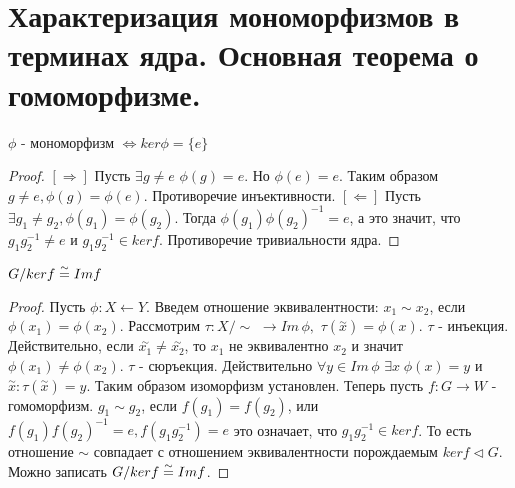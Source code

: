 \section{Характеризация мономорфизмов в терминах ядра. Основная теорема о гомоморфизме.}

\begin{thm}
$ \phi $ - мономорфизм $ \Leftrightarrow ker \phi = \{e\} $
\end{thm}
\begin{proof}
  $ [\Rightarrow] $ Пусть $ \exists g \ne e $ $ \phi(g) = e $. Но $ \phi(e) = e $. Таким образом $ g \ne e, \phi(g) = \phi(e) $. 
  Противоречие инъективности. \newline
  $ [\Leftarrow] $ Пусть $ \exists g_{1} \ne g_{2}, \phi(g_{1}) = \phi(g_{2}) $. Тогда $ \phi(g_{1})\phi(g_{2})^{-1} = e $,
  а это значит, что $ g_{1}g_{2}^{-1} \ne e $ и $ g_{1}g_{2}^{-1} \in ker f $. Противоречие тривиальности ядра. 
\end{proof}

\begin{thm}
  $ G/ker f \buildrel{\sim}\over{=} Im f $
\end{thm}
\begin{proof}
  Пусть $ \phi : X \leftarrow Y $. Введем отношение эквивалентности: $ x_1 \sim x_2 $, если $ \phi(x_1) = \phi(x_2) $. 
  Рассмотрим $ \tau : X/\!\!\!\sim  $ $ \rightarrow Im \, \phi, $ $ \tau(\overset\sim{x}) = \phi(x). $ \newline
  $ \tau $ - инъекция. Действительно, если $ \overset\sim{x_1} \ne \overset\sim{x_2} $, то $ x_1 $ не эквивалентно $ x_2 $
  и значит $ \phi(x_1) \ne \phi(x_2) $. \newline
  $ \tau $ - сюръекция. Действительно $ \forall y \in Im \, \phi $ $ \exists x \; \phi(x) = y $ и 
  $ \overset\sim{x} : \tau(\overset\sim{x}) = y $. Таким образом изоморфизм установлен. \newline
  Теперь пусть $ f : G \rightarrow W $ - гомоморфизм. $ g_1 \sim g_2 $, если $ f(g_1) = f(g_2) $, или 
  $ f(g_1)f(g_2)^{-1} = e, f(g_1g_2^{-1}) = e $ это означает, что $ g_1g_2^{-1} \in ker f $. То есть отношение $ \sim $
  совпадает с отношением эквивалентности порождаемым $ ker f \triangleleft G $. Можно записать
  $ G/ker f \buildrel{\sim}\over{=} Im f $.
\end{proof}



